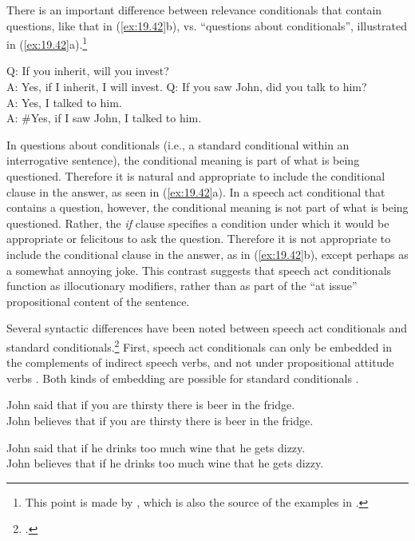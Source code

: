 There is an important difference between relevance conditionals that contain questions, like that in (\ref{ex:19.42}b), vs. “questions about conditionals”, illustrated in (\ref{ex:19.42}a).\footnote{This point is made by \citet{vanderAuwera1986}, which is also the source of the examples in .}


\ea \label{ex:19.42}
\ea   Q: If you inherit, will you invest?\\
A: Yes, if I inherit, I will invest.
\ex  Q: If you saw John, did you talk to him?\\
A: Yes, I talked to him.\\
A: \#Yes, if I saw John, I talked to him.
\z \z


In questions about conditionals (i.e., a standard conditional within an interrogative sentence), the conditional meaning is part of what is being questioned. Therefore it is natural and appropriate to include the conditional clause in the answer, as seen in (\ref{ex:19.42}a). In a speech act conditional that contains a question, however, the conditional meaning is not part of what is being questioned. Rather, the \textit{if} clause specifies a condition under which it would be appropriate or felicitous to ask the question. Therefore it is not appropriate to include the conditional clause in the answer, as in (\ref{ex:19.42}b), except perhaps as a somewhat annoying joke. This contrast suggests that speech act conditionals function as illocutionary modifiers, rather than as part of the “at issue” propositional content of the sentence.



Several syntactic differences have been noted between speech act conditionals and standard conditionals.\footnote{\citet{BhattPancheva2006}.} First, speech act conditionals can only be embedded in the complements of indirect speech verbs, and not under propositional attitude verbs . Both kinds of embedding are possible for standard conditionals .


\ea \label{ex:19.43}
\ea  John said that if you are thirsty there is beer in the fridge.\\
\ex *John believes that if you are thirsty there is beer in the fridge.
                       \z
\z

\ea \label{ex:19.44}
\ea  John said that if he drinks too much wine that he gets dizzy.\\
\ex John believes that if he drinks too much wine that he gets dizzy.
                       \z
\z



